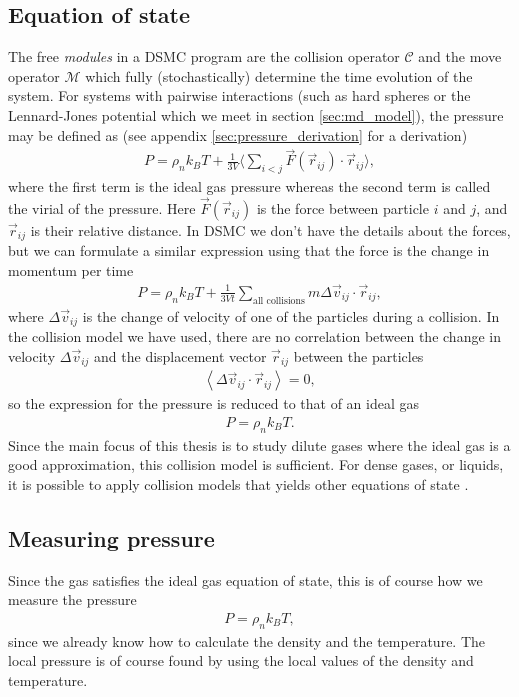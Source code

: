 \subsection{Equation of state}
\label{sec:dsmc_eos}
The free \textit{modules} in a DSMC program are the collision operator $\mathcal C$ and the move operator $\mathcal M$ which fully (stochastically) determine the time evolution of the system. For systems with pairwise interactions (such as hard spheres or the Lennard-Jones potential which we meet in section \ref{sec:md_model}), the pressure may be defined as (see appendix \ref{sec:pressure_derivation} for a derivation)
\begin{align}
	P = \rho_nk_BT + \frac{1}{3V}\bigg\langle \sum_{i<j} \vec F(\vec r_{ij})\cdot \vec r_{ij}\bigg\rangle,
\end{align}
where the first term is the ideal gas pressure whereas the second term is called the virial of the pressure. Here $\vec F(\vec r_{ij})$ is the force between particle $i$ and $j$, and $\vec r_{ij}$ is their relative distance. In DSMC we don't have the details about the forces, but we can formulate a similar expression using that the force is the change in momentum per time
\begin{align}
	P = \rho_nk_BT + \frac{1}{3Vt}\sum_\text{all collisions} m\Delta \vec v_{ij}\cdot \vec r_{ij},
\end{align}
where $\Delta \vec v_{ij}$ is the change of velocity of one of the particles during a collision\cite{garcia1997direct}. In the collision model we have used, there are no correlation between the change in velocity $\Delta \vec v_{ij}$ and the displacement vector $\vec r_{ij}$ between the particles
\begin{align}
	\left\langle \Delta \vec v_{ij}\cdot \vec r_{ij}\right\rangle = 0,
\end{align}
so the expression for the pressure is reduced to that of an ideal gas
\begin{align}
	P = \rho_n k_BT.
\end{align}
Since the main focus of this thesis is to study dilute gases where the ideal gas is a good approximation, this collision model is sufficient. For dense gases, or liquids, it is possible to apply collision models that yields other equations of state \cite{garcia1997direct}.
\subsection{Measuring pressure}
Since the gas satisfies the ideal gas equation of state, this is of course how we measure the pressure
\begin{align}
	P = \rho_n k_BT,
\end{align}
since we already know how to calculate the density and the temperature. The local pressure is of course found by using the local values of the density and temperature.
